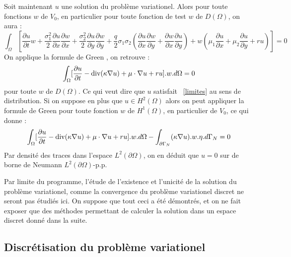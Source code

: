\documentclass{book}
\begin{document}
Soit maintenant $u$ une solution du problème variationel. Alors pour toute fonctions $w$ de $V_{0}$, en particulier pour toute fonction de test $w$ de $D(\Omega)$, on aura :
\[
\int_{\Omega}[\frac{\partial u}{\partial t}w+\frac{\sigma_{1}^{2}}{2}\frac{\partial u}{\partial x}\frac{\partial w}{\partial x}+\frac{\sigma_{2}^{2}}{2}\frac{\partial u}{\partial y}\frac{\partial w}{\partial y}+\frac{q}{2}\sigma_{1}\sigma_{2}(\frac{\partial u}{\partial x}\frac{\partial w}{\partial y}+\frac{\partial w}{\partial x}\frac{\partial u}{\partial y})+w(\mu_{1}\frac{\partial u}{\partial x}+\mu_{2}\frac{\partial u}{\partial y}+ru)]=0
\]
On applique la formule de Green , on retrouve :
\[
\int_{\Omega}[\frac{\partial u}{\partial t}-\hbox{div}(\kappa\nabla u)+\mu\cdot\nabla u+r u].w.d\Omega = 0
\]
pour toute $w$ de $D(\Omega)$. Ce qui veut dire que $u$ satisfait ~\eqref{limites} au sens de distribution. Si on suppose en plus que $u \in H^{2}(\Omega)$ alors on peut appliquer la formule de Green pour toute fonction $w$ de $H^{1}(\Omega)$, en particulier de $V_{0}$, ce qui donne :
\[
  \int_{\Omega}[\frac{\partial u}{\partial t}-\hbox{div}(\kappa\nabla u)+\mu\cdot\nabla u+r u].w.d\Omega 
 -\int_{\partial \Gamma_{N}}(\kappa\nabla u). w .\eta .d\Gamma_{N} = 0				
\]
Par densité des traces dans l'espace $L^{2}(\partial \Omega)$, on en déduit que $u=0$ sur de borne de Neumann $L^{2}(\partial \Omega)$-p.p.

Par limite du programme, l'étude de l'existence et l'unicité de la solution du problème variationel, comme la convergence du problème variationel discret ne seront pas étudiés ici. On suppose que tout ceci a été démontrés, et on ne fait exposer que des méthodes permettant de calculer la solution dans un espace discret donné dans la suite.  
\subsection{Discrétisation du problème variationel}
\end{document}
